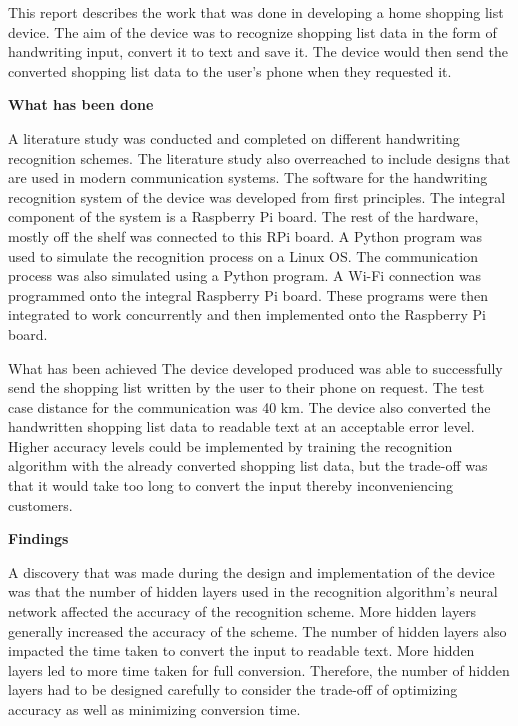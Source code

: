 
This report describes the work that was done in developing a home shopping list device. The aim of the device was to recognize shopping list data in the form of handwriting input, convert it to text and save it. The device would then send the converted shopping list data to the user’s phone when they requested it. 

\textbf{What has been done}

A literature study was conducted and completed on different handwriting recognition schemes. The literature study also overreached to include designs that are used in modern communication systems. The software for the handwriting recognition system of the device was developed from first principles. The integral component of the system is a Raspberry Pi board. The rest of the hardware, mostly off the shelf was connected to this RPi board. A Python program was used to simulate the recognition process on a Linux OS. The communication process was also simulated using a Python program. A Wi-Fi connection was programmed onto the integral Raspberry Pi board. These programs were then integrated to work concurrently and then implemented onto the Raspberry Pi board.

What has been achieved
The device developed produced was able to successfully send the shopping list written by the user to their phone on request. The test case distance for the communication was 40 km. The device also converted the handwritten shopping list data to readable text at an acceptable error level. Higher accuracy levels could be implemented by training the recognition algorithm with the already converted shopping list data, but the trade-off was that it would take too long to convert the  
input thereby inconveniencing customers. 


\textbf{Findings}

A discovery that was made during the design and implementation of the device was that the number of hidden layers used in the recognition algorithm’s neural network affected the accuracy of the recognition scheme. More hidden layers generally increased the accuracy of the scheme. The number of hidden layers also impacted the time taken to convert the input to readable text. More hidden layers led to more time taken for full conversion. Therefore, the number of hidden layers had to be designed carefully to consider the trade-off of optimizing accuracy as well as minimizing conversion time.

